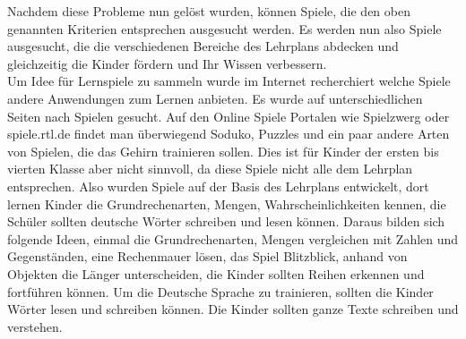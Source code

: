 Nachdem diese Probleme nun gelöst wurden, können Spiele, die den oben genannten Kriterien entsprechen ausgesucht werden. Es werden nun also Spiele ausgesucht, die die verschiedenen Bereiche des Lehrplans abdecken und gleichzeitig die Kinder fördern und Ihr Wissen verbessern.\\
Um Idee für Lernspiele zu sammeln wurde im Internet recherchiert welche Spiele andere Anwendungen zum Lernen anbieten. Es wurde auf unterschiedlichen Seiten nach Spielen gesucht. Auf den Online Spiele Portalen wie Spielzwerg oder spiele.rtl.de findet man überwiegend Soduko, Puzzles und ein paar andere Arten von Spielen, die das Gehirn trainieren sollen. Dies ist für Kinder der ersten bis vierten Klasse aber nicht sinnvoll, da diese Spiele nicht alle dem Lehrplan entsprechen. Also wurden Spiele auf der Basis des Lehrplans entwickelt, dort lernen Kinder die Grundrechenarten, Mengen, Wahrscheinlichkeiten kennen, die Schüler sollten deutsche Wörter schreiben und lesen können. Daraus bilden sich folgende Ideen, einmal die Grundrechenarten, Mengen vergleichen mit Zahlen und Gegenständen, eine Rechenmauer lösen, das Spiel Blitzblick, anhand von Objekten die Länger unterscheiden, die Kinder sollten Reihen erkennen und fortführen können. Um die Deutsche Sprache zu trainieren, sollten die Kinder Wörter lesen und schreiben können. Die Kinder sollten ganze Texte schreiben und verstehen.\\
